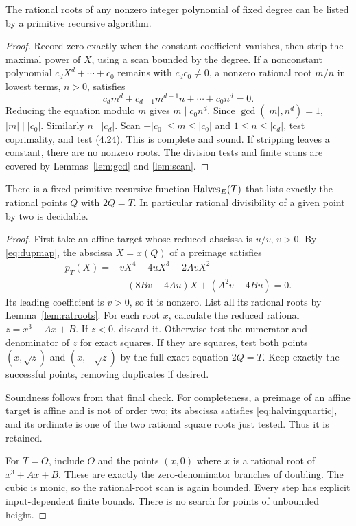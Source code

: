 \begin{lemma}\label{lem:ratroots}
The rational roots of any nonzero integer polynomial of fixed degree can
be listed by a primitive recursive algorithm.
\end{lemma}
\begin{proof}
Record zero exactly when the constant coefficient vanishes, then strip
the maximal power of $X$, using a scan bounded by the degree.
If a nonconstant polynomial
$c_dX^d+\cdots+c_0$ remains with $c_dc_0\ne0$, a nonzero rational
root $m/n$ in lowest terms, $n>0$, satisfies
\[
 c_dm^d+c_{d-1}m^{d-1}n+\cdots+c_0n^d=0.
 \tag{4.24}
\]
Reducing the equation modulo $m$ gives $m\mid c_0n^d$.
Since $\gcd(|m|,n^d)=1$, $|m|\mid|c_0|$.
Similarly $n\mid|c_d|$. Scan
$-|c_0|\le m\le|c_0|$ and $1\le n\le|c_d|$, test coprimality,
and test (4.24). This is complete and sound.
If stripping leaves a constant, there are no nonzero roots.
The division tests and finite scans are covered by
Lemmas~\ref{lem:gcd} and \ref{lem:scan}.
\end{proof}

\begin{theorem}\label{thm:halves}
There is a fixed primitive recursive function $\operatorname{Halves}_E(T)$ that lists
exactly the rational points $Q$ with $2Q=T$. In particular rational
divisibility of a given point by two is decidable.
\end{theorem}
\begin{proof}
First take an affine target whose reduced abscissa is $u/v$, $v>0$.
By \eqref{eq:dupmap}, the abscissa $X=x(Q)$ of a preimage satisfies
\[
\begin{split}
 p_T(X)={}&vX^4-4uX^3-2AvX^2\\
          &-(8Bv+4Au)X+(A^2v-4Bu)=0.
\end{split}
\tag{4.25}\label{eq:halvingquartic}
\]
Its leading coefficient is $v>0$, so it is nonzero.
List all its rational roots by Lemma~\ref{lem:ratroots}.
For each root $x$, calculate the reduced rational
$z=x^3+Ax+B$. If $z<0$, discard it. Otherwise test the numerator
and denominator of $z$ for exact squares. If they are squares, test
both points $(x,\sqrt z)$ and $(x,-\sqrt z)$ by the full exact equation
$2Q=T$. Keep exactly the successful points, removing duplicates if desired.

Soundness follows from that final check. For completeness, a preimage of
an affine target is affine and is not of order two; its abscissa satisfies
\eqref{eq:halvingquartic}, and its ordinate is one of the two rational
square roots just tested. Thus it is retained.

For $T=O$, include $O$ and the points $(x,0)$ where $x$ is a rational
root of $x^3+Ax+B$. These are exactly the zero-denominator branches
of doubling. The cubic is monic, so the rational-root scan is again
bounded. Every step has explicit input-dependent finite bounds.
There is no search for points of unbounded height.
\end{proof}

